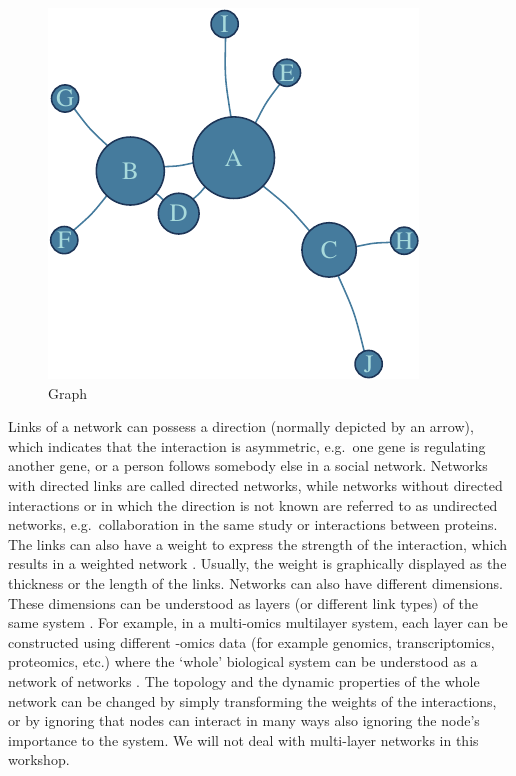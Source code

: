 \documentclass[
]{book}
\begin{document}
\begin{figure}

{\centering \includegraphics[width=0.8\linewidth]{NetMed_files/figure-latex/GRAPH-1} 

}

\caption{Graph}\label{fig:GRAPH}
\end{figure}

Links of a network can possess a direction (normally depicted by an arrow), which indicates that the interaction is asymmetric, e.g.~one gene is regulating another gene, or a person follows somebody else in a social network. Networks with directed links are called directed networks, while networks without directed interactions or in which the direction is not known are referred to as undirected networks, e.g.~collaboration in the same study or interactions between proteins. The links can also have a weight to express the strength of the interaction, which results in a weighted network \citep{Newman2018, Barabasi2016}. Usually, the weight is graphically displayed as the thickness or the length of the links. Networks can also have different dimensions. These dimensions can be understood as layers (or different link types) of the same system \citep{Kurant2006LayeredNetworks, Kivela2014MultilayerNetworks}. For example, in a multi-omics multilayer system, each layer can be constructed using different -omics data (for example genomics, transcriptomics, proteomics, etc.) where the `whole' biological system can be understood as a network of networks \citep{DeDomenico2017}. The topology and the dynamic properties of the whole network can be changed by simply transforming the weights of the interactions, or by ignoring that nodes can interact in many ways \citep{Mucha2010CommunityNetworks, Radicchi2013AbruptNetworks} also ignoring the node's importance to the system. We will not deal with multi-layer networks in this workshop.
\end{document}

